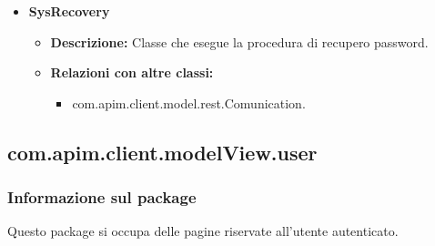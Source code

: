 {{{\begin{itemize}
\begin{itemize}
						\begin{itemize}
							\item com.apim.client.view.PwsRecover;
							\item com.apim.client.modelView.navigation.SysRecovery.
						\end{itemize}
					\end{itemize}
				\item \textbf{SysRecovery}
					\begin{itemize}
						\item \textbf{Descrizione:} Classe che esegue la procedura di recupero password.
						\item \textbf{Relazioni con altre classi:}
						\begin{itemize}
							\item com.apim.client.model.rest.Comunication.
						\end{itemize}
					\end{itemize}
			\end{itemize}
		}
	}
	\subsection{com.apim.client.modelView.user}{
		\subsubsection{Informazione sul package}{
			Questo package si occupa delle pagine riservate all'utente autenticato.
		}
}}
